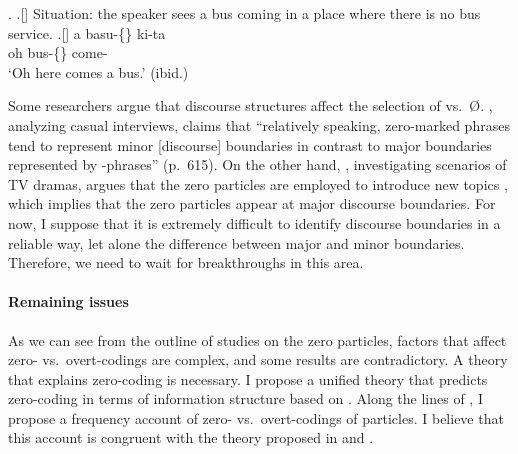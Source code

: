 \ex.
 \a.[] Situation: the speaker sees a bus coming in a place
       where there is no bus service.
 \bg.[] a basu-\{\} ki-ta \\
      oh bus-\{\} come- \\
      `Oh here comes a bus.'
      \hfill{(ibid.)}


Some researchers argue that
discourse structures affect the selection of  vs.~{\O}.
, analyzing casual interviews,
claims that
``relatively speaking, zero-marked phrases tend to represent
minor [discourse] boundaries in contrast to major boundaries represented
by -phrases'' (p.~615).
On the other hand,
,
investigating scenarios of TV dramas,
argues that the zero particles are employed to introduce new topics
\cite[see also][]{niwa06},
which implies that the zero particles appear at major discourse boundaries.
For now,
I suppose that it is extremely difficult to identify discourse boundaries in a reliable way,
let alone the difference between major and minor boundaries.
Therefore, we need to wait for breakthroughs in this area.

\paragraph{Remaining issues}

As we can see from the outline of studies on the zero particles,
factors that affect zero- vs.~overt-codings are complex,
and some results are contradictory.
A theory that explains zero-coding is necessary.
I propose a unified theory that predicts zero-coding in terms of
information structure
based on .
Along the lines of ,
I propose a frequency account of zero- vs.~overt-codings of particles.
I believe that this account is congruent with
the theory proposed in  and .



